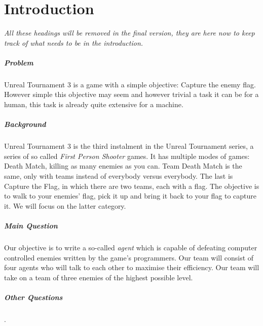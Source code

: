 \chapter{Introduction}
\emph{All these headings will be removed in the final version, they are here now to keep track of what needs to be in the introduction.}
\paragraph{Problem}
Unreal Tournament 3 is a game with a simple objective: Capture the enemy flag. However simple this objective may seem and however trivial a task it can be for a human, this task is already quite extensive for a machine.
\paragraph{Background}
Unreal Tournament 3 is the third instalment in the Unreal Tournament series, a series of so called \emph{First Person Shooter} games. It has multiple modes of games: Death Match, killing as many enemies as you can. Team Death Match is the same, only with teams instead of everybody versus everybody. The last is Capture the Flag, in which there are two teams, each with a flag. The objective is to walk to your enemies' flag, pick it up and bring it back to your flag to capture it. We will focus on the latter category.
\paragraph{Main Question}
Our objective is to write a so-called \emph{agent} which is capable of defeating computer controlled enemies written by the game's programmers. Our team will consist of four agents who will talk to each other to maximise their efficiency. Our team will take on a team of three enemies of the highest possible level.
\paragraph{Other Questions}
.
